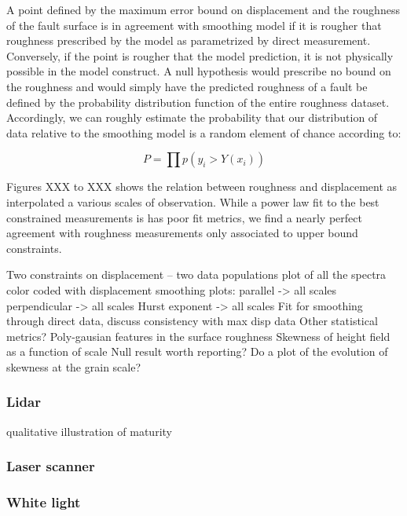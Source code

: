 \documentclass[12pt,a4paper]{article}
\begin{document}
\begin{itemize}
A point defined by the maximum error bound on displacement and the roughness of the fault surface is in agreement with smoothing model if it is rougher that roughness prescribed by the model as parametrized by direct measurement. Conversely, if the point is rougher that the model prediction, it is not physically possible in the model construct. A null hypothesis would prescribe no bound on the roughness and would simply have the predicted roughness of a fault be defined by the probability distribution function of the entire roughness dataset. Accordingly, we can roughly estimate the probability that our distribution of data relative to the smoothing model is a random element of chance according to:

\begin{equation}
 P = \prod p(y_i>Y(x_i))
\end{equation} 
 

Figures XXX to XXX shows the relation between roughness and displacement as interpolated a various scales of observation. While a power law fit to the best constrained measurements is has poor fit metrics, we find a nearly perfect agreement with roughness measurements only associated to upper bound constraints.




Two constraints on displacement – two data populations
plot of all the spectra color coded with displacement
smoothing plots:
	parallel -> all scales
	perpendicular -> all scales
	Hurst exponent -> all scales
Fit for smoothing through direct data, discuss consistency with max disp data
Other statistical metrics?
	Poly-gausian features in the surface roughness
	Skewness of height field as a function of scale
		Null result worth reporting?
		Do a plot of the evolution of skewness at the grain scale?




\subsubsection{Lidar}
qualitative illustration of maturity

\subsubsection{Laser scanner}

\subsubsection{White light}


\end{itemize}
\end{document}
